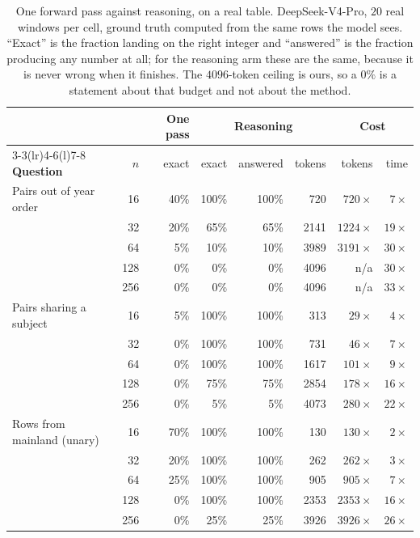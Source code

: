 \documentclass[10pt]{article}
\theoremstyle{definition}
\begin{document}
\begin{table}[htbp]
\centering
\caption{One forward pass against reasoning, on a real table.
DeepSeek-V4-Pro, $20$ real windows per cell, ground truth computed from the
same rows the model sees. ``Exact'' is the fraction landing on the right
integer and ``answered'' is the fraction producing any number at all; for
the reasoning arm these are the same, because it is never wrong when it
finishes. The $4096$-token ceiling is ours, so a $0\%$ is a statement about
that budget and not about the method.}
\label{tab:realdocs}
\small
\begin{tabular}{@{}lrrrrrrr@{}}
\toprule
& & \textbf{One pass} & \multicolumn{3}{c}{\textbf{Reasoning}} & \multicolumn{2}{c}{\textbf{Cost}} \\
\cmidrule(lr){3-3}\cmidrule(lr){4-6}\cmidrule(l){7-8}
\textbf{Question} & $n$ & exact & exact & answered & tokens & tokens & time \\
\midrule
Pairs out of year order & 16 & 40\% & 100\% & 100\% & 720 & $720\times$ & $7\times$ \\
 & 32 & 20\% & 65\% & 65\% & 2141 & $1224\times$ & $19\times$ \\
 & 64 & 5\% & 10\% & 10\% & 3989 & $3191\times$ & $30\times$ \\
 & 128 & 0\% & 0\% & 0\% & 4096 & n/a & $30\times$ \\
 & 256 & 0\% & 0\% & 0\% & 4096 & n/a & $33\times$ \\
\midrule
Pairs sharing a subject & 16 & 5\% & 100\% & 100\% & 313 & $29\times$ & $4\times$ \\
 & 32 & 0\% & 100\% & 100\% & 731 & $46\times$ & $7\times$ \\
 & 64 & 0\% & 100\% & 100\% & 1617 & $101\times$ & $9\times$ \\
 & 128 & 0\% & 75\% & 75\% & 2854 & $178\times$ & $16\times$ \\
 & 256 & 0\% & 5\% & 5\% & 4073 & $280\times$ & $22\times$ \\
\midrule
Rows from mainland (unary) & 16 & 70\% & 100\% & 100\% & 130 & $130\times$ & $2\times$ \\
 & 32 & 20\% & 100\% & 100\% & 262 & $262\times$ & $3\times$ \\
 & 64 & 25\% & 100\% & 100\% & 905 & $905\times$ & $7\times$ \\
 & 128 & 0\% & 100\% & 100\% & 2353 & $2353\times$ & $16\times$ \\
 & 256 & 0\% & 25\% & 25\% & 3926 & $3926\times$ & $26\times$ \\
\bottomrule
\end{tabular}
\end{table}
\end{document}
